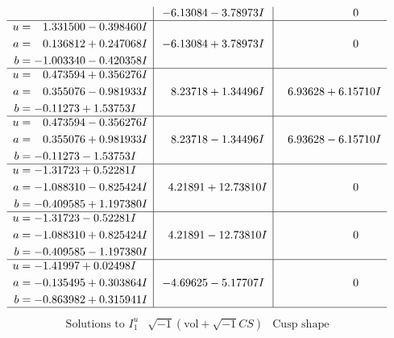 \documentclass[1p]{elsarticle_modified}
\theoremstyle{definition}
\newcommand{\I}{\sqrt{-1}}
\begin{document}
$$\begin{array}{c|c|c}
 & -6.13084 - 3.78973 I & \phantom{-0.000000 } 0 \\ \hline\begin{aligned}
u &= \phantom{-}1.331500 - 0.398460 I \\
a &= \phantom{-}0.136812 + 0.247068 I \\
b &= -1.003340 - 0.420358 I\end{aligned}
 & -6.13084 + 3.78973 I & \phantom{-0.000000 } 0 \\ \hline\begin{aligned}
u &= \phantom{-}0.473594 + 0.356276 I \\
a &= \phantom{-}0.355076 - 0.981933 I \\
b &= -0.11273 + 1.53753 I\end{aligned}
 & \phantom{-}8.23718 + 1.34496 I & \phantom{-}6.93628 + 6.15710 I \\ \hline\begin{aligned}
u &= \phantom{-}0.473594 - 0.356276 I \\
a &= \phantom{-}0.355076 + 0.981933 I \\
b &= -0.11273 - 1.53753 I\end{aligned}
 & \phantom{-}8.23718 - 1.34496 I & \phantom{-}6.93628 - 6.15710 I \\ \hline\begin{aligned}
u &= -1.31723 + 0.52281 I \\
a &= -1.088310 - 0.825424 I \\
b &= -0.409585 + 1.197380 I\end{aligned}
 & \phantom{-}4.21891 + 12.73810 I & \phantom{-0.000000 } 0 \\ \hline\begin{aligned}
u &= -1.31723 - 0.52281 I \\
a &= -1.088310 + 0.825424 I \\
b &= -0.409585 - 1.197380 I\end{aligned}
 & \phantom{-}4.21891 - 12.73810 I & \phantom{-0.000000 } 0 \\ \hline\begin{aligned}
u &= -1.41997 + 0.02498 I \\
a &= -0.135495 + 0.303864 I \\
b &= -0.863982 + 0.315941 I\end{aligned}
 & -4.69625 - 5.17707 I & \phantom{-0.000000 } 0\\
 \hline 
 \end{array}$$\newpage$$\begin{array}{c|c|c}  
\text{Solutions to }I^u_{1}& \I (\text{vol} + \sqrt{-1}CS) & \text{Cusp shape}\\

\end{array}$$
\end{document}
